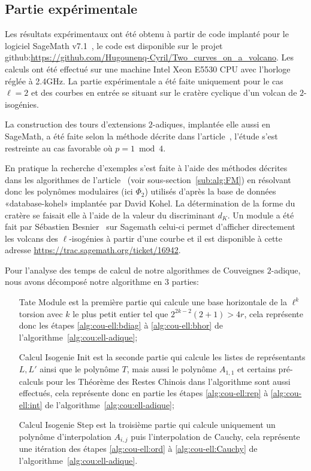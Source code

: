 \documentclass[10pt,a4paper]{book}
\theoremstyle{plain}
\theoremstyle{definition}
\theoremstyle{definition}
\theoremstyle{definition}
\theoremstyle{definition}
\theoremstyle{definition}
\theoremstyle{remark}
\theoremstyle{remark}
\theoremstyle{definition}
\begin{document}
\subsection{Partie expérimentale}
\label{ssec:exp:cou}

Les résultats expérimentaux ont été obtenu à partir de code implanté pour le 
logiciel SageMath v7.1~\cite{Sage}, le code est disponible sur le projet 
github:\url{https://github.com/Hugounenq-Cyril/Two_curves_on_a_volcano}. Les 
calculs ont été effectué sur une machine Intel Xeon E5530 CPU avec l'horloge 
réglée à 2.4GHz. La partie expérimentale a été faite uniquement pour le cas 
$\ell=2$ et des courbes en entrée se situant sur le cratère cyclique d'un 
volcan de $2$-isogénies.

La construction des tours d'extensions $2$-adiques, implantée elle aussi en 
SageMath, a été faite selon la méthode
décrite dans l'article~\cite{Doliskani-Schost15}, l'étude s'est restreinte au 
cas favorable où $p=1 \bmod 4$.

En pratique la recherche d'exemples s'est faite à l'aide des méthodes décrites
dans les algorithmes de l'article~\cite{FouquetMorain02} (voir 
sous-section~\ref{sub:alg:FM}) en résolvant donc les
polynômes modulaires (ici $\Phi_2$) utilisés d'après la base de données 
«database-kohel» implantée par David Kohel. La détermination de la forme du 
cratère se faisait elle à l'aide de la valeur du discriminant $d_K$. Un module 
a été fait par Sébastien Besnier~\cite{Besnier14} sur Sagemath celui-ci permet 
d'afficher directement les volcans des $\ell$-isogénies à partir d'une courbe 
et il est disponible à cette adresse 
\url{https://trac.sagemath.org/ticket/16942}. 

Pour l'analyse des temps de calcul de notre algorithmes de Couveignes 
$2$-adique, nous avons décomposé notre algorithme en 3 parties:
\begin{enumerate}
\item[Tate Module] est la première partie qui calcule une base horizontale de 
la $\ell^k$ torsion avec $k$ le plus petit entier tel que $2^{2k-2}(2+1)> 4r$,
cela représente donc les étapes \ref{alg:cou-ell:bdiag} à 
\ref{alg:cou-ell:bhor} de l'algorithme~\ref{alg:cou:ell-adique};
\item[Calcul Isogenie Init] est la seconde partie qui calcule les listes de 
représentants $L,L'$ ainsi que le polynôme $T$, mais aussi le polynôme 
$A_{1,1}$ et certains pré-calculs pour les Théorème des Restes Chinois dans 
l'algorithme sont aussi effectués, cela représente donc en partie les étapes 
\ref{alg:cou-ell:rep} à \ref{alg:cou-ell:int} de 
l'algorithme~\ref{alg:cou:ell-adique};
\item[Calcul Isogenie Step] est la troisième partie qui calcule uniquement 
un polynôme d'interpolation $A_{i,j}$ puis l'interpolation de 
Cauchy, cela représente une itération des étapes \ref{alg:cou-ell:ord} à 
\ref{alg:cou-ell:Cauchy} de l'algorithme~\ref{alg:cou:ell-adique}.
\end{enumerate}
\end{document}
